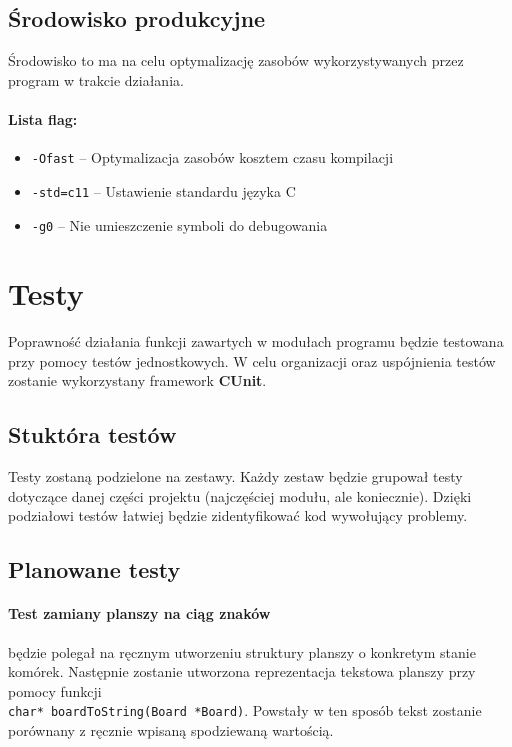\documentclass{article}
\begin{document}
\subsection{Środowisko produkcyjne}
Środowisko to ma na celu optymalizację zasobów wykorzystywanych przez program w trakcie działania.

\paragraph{Lista flag:}
\begin{itemize}
	\item \texttt{-Ofast} -- Optymalizacja zasobów kosztem czasu kompilacji
	\item \texttt{-std=c11} -- Ustawienie standardu języka C
	\item \texttt{-g0} -- Nie umieszczenie symboli do debugowania
\end{itemize}

\section{Testy}
Poprawność działania funkcji zawartych w modułach programu będzie testowana przy pomocy testów jednostkowych. W celu organizacji oraz uspójnienia testów zostanie wykorzystany framework \textbf{CUnit}.

\subsection{Stuktóra testów}
Testy zostaną podzielone na zestawy. Każdy zestaw będzie grupował testy dotyczące danej części projektu (najczęściej modułu, ale koniecznie). Dzięki podziałowi testów łatwiej będzie zidentyfikować kod wywołujący problemy.

\subsection{Planowane testy}

\paragraph{Test zamiany planszy na ciąg znaków} będzie polegał na ręcznym utworzeniu struktury planszy o konkretym stanie komórek. Następnie zostanie utworzona reprezentacja tekstowa planszy przy pomocy funkcji \\ \texttt{char* boardToString(Board *Board)}. Powstały w ten sposób tekst zostanie porównany z ręcznie wpisaną spodziewaną wartością.
\end{document}
